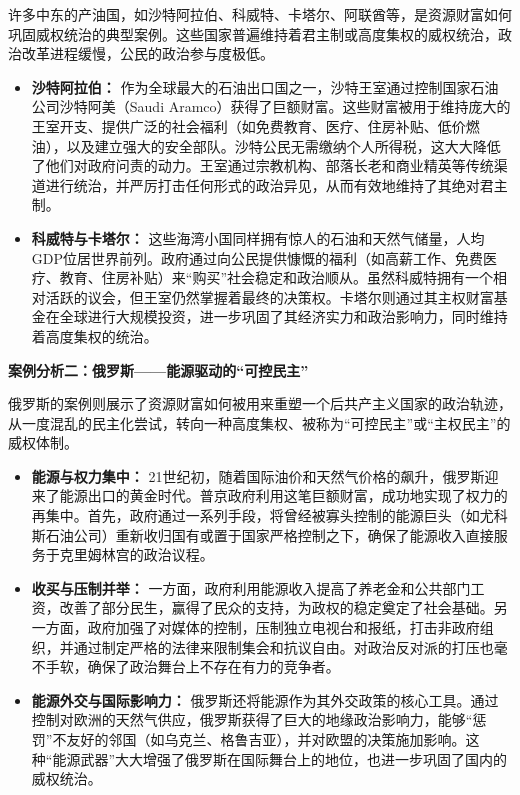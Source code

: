 许多中东的产油国，如沙特阿拉伯、科威特、卡塔尔、阿联酋等，是资源财富如何巩固威权统治的典型案例。这些国家普遍维持着君主制或高度集权的威权统治，政治改革进程缓慢，公民的政治参与度极低。

\begin{itemize}
    \item \textbf{沙特阿拉伯：} 作为全球最大的石油出口国之一，沙特王室通过控制国家石油公司沙特阿美（Saudi Aramco）获得了巨额财富。这些财富被用于维持庞大的王室开支、提供广泛的社会福利（如免费教育、医疗、住房补贴、低价燃油），以及建立强大的安全部队。沙特公民无需缴纳个人所得税，这大大降低了他们对政府问责的动力。王室通过宗教机构、部落长老和商业精英等传统渠道进行统治，并严厉打击任何形式的政治异见，从而有效地维持了其绝对君主制。
    \item \textbf{科威特与卡塔尔：} 这些海湾小国同样拥有惊人的石油和天然气储量，人均GDP位居世界前列。政府通过向公民提供慷慨的福利（如高薪工作、免费医疗、教育、住房补贴）来“购买”社会稳定和政治顺从。虽然科威特拥有一个相对活跃的议会，但王室仍然掌握着最终的决策权。卡塔尔则通过其主权财富基金在全球进行大规模投资，进一步巩固了其经济实力和政治影响力，同时维持着高度集权的统治。
\end{itemize}

\textbf{案例分析二：俄罗斯——能源驱动的“可控民主”}

俄罗斯的案例则展示了资源财富如何被用来重塑一个后共产主义国家的政治轨迹，从一度混乱的民主化尝试，转向一种高度集权、被称为“可控民主”或“主权民主”的威权体制。

\begin{itemize}
    \item \textbf{能源与权力集中：} 21世纪初，随着国际油价和天然气价格的飙升，俄罗斯迎来了能源出口的黄金时代。普京政府利用这笔巨额财富，成功地实现了权力的再集中。首先，政府通过一系列手段，将曾经被寡头控制的能源巨头（如尤科斯石油公司）重新收归国有或置于国家严格控制之下，确保了能源收入直接服务于克里姆林宫的政治议程。
    \item \textbf{收买与压制并举：} 一方面，政府利用能源收入提高了养老金和公共部门工资，改善了部分民生，赢得了民众的支持，为政权的稳定奠定了社会基础。另一方面，政府加强了对媒体的控制，压制独立电视台和报纸，打击非政府组织，并通过制定严格的法律来限制集会和抗议自由。对政治反对派的打压也毫不手软，确保了政治舞台上不存在有力的竞争者。
    \item \textbf{能源外交与国际影响力：} 俄罗斯还将能源作为其外交政策的核心工具。通过控制对欧洲的天然气供应，俄罗斯获得了巨大的地缘政治影响力，能够“惩罚”不友好的邻国（如乌克兰、格鲁吉亚），并对欧盟的决策施加影响。这种“能源武器”大大增强了俄罗斯在国际舞台上的地位，也进一步巩固了国内的威权统治。
\end{itemize}

